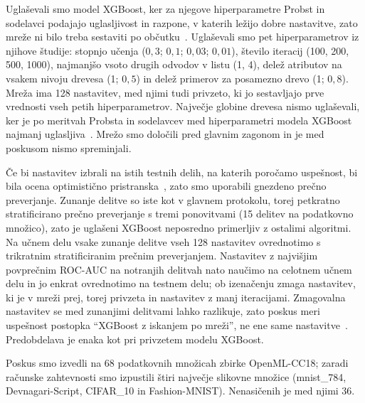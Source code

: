 \documentclass[a4paper,12pt,openright]{book}
\begin{document}
Uglaševali smo model XGBoost, ker za njegove hiperparametre Probst in
sodelavci podajajo uglasljivost in razpone, v katerih ležijo dobre nastavitve,
zato mreže ni bilo treba sestaviti po občutku~\cite{probst2019tunability}.
Uglaševali smo pet hiperparametrov iz njihove študije: stopnjo učenja
($0{,}3$; $0{,}1$; $0{,}03$; $0{,}01$), število iteracij (100, 200, 500, 1000),
najmanjšo vsoto drugih odvodov v listu (1, 4), delež atributov na vsakem nivoju
drevesa (1; $0{,}5$) in delež primerov za posamezno drevo (1; $0{,}8$). Mreža
ima 128 nastavitev, med njimi tudi privzeto, ki jo sestavljajo prve vrednosti
vseh petih hiperparametrov. Največje globine drevesa nismo uglaševali, ker je
po meritvah Probsta in sodelavcev med hiperparametri modela XGBoost najmanj
uglasljiva~\cite{probst2019tunability}. Mrežo smo določili pred glavnim
zagonom in je med poskusom nismo spreminjali.

Če bi nastavitev izbrali na istih testnih delih, na katerih poročamo
uspešnost, bi bila ocena optimistično pristranska~\cite{cawley2010over,varma2006bias},
zato smo uporabili gnezdeno prečno preverjanje. Zunanje delitve so iste kot v glavnem protokolu,
torej petkratno stratificirano prečno preverjanje s tremi ponovitvami (15
delitev na podatkovno množico), zato je uglašeni XGBoost neposredno primerljiv
z ostalimi algoritmi. Na učnem delu
vsake zunanje delitve vseh 128 nastavitev ovrednotimo s trikratnim
stratificiranim prečnim preverjanjem. Nastavitev z najvišjim povprečnim
ROC-AUC na notranjih delitvah nato naučimo na celotnem učnem delu in jo enkrat
ovrednotimo na testnem delu; ob izenačenju zmaga nastavitev, ki je v mreži
prej, torej privzeta in nastavitev z manj iteracijami. Zmagovalna nastavitev se med
zunanjimi delitvami lahko razlikuje, zato poskus meri uspešnost postopka
\enquote{XGBoost z iskanjem po mreži}, ne ene same
nastavitve~\cite{bischl2023hyperparameter}. Predobdelava je enaka kot pri
privzetem modelu XGBoost.

Poskus smo izvedli na 68 podatkovnih množicah zbirke OpenML-CC18; zaradi
računske zahtevnosti smo izpustili štiri največje slikovne množice
(mnist\_784, Devnagari-Script, CIFAR\_10 in Fashion-MNIST). Nenasičenih je
med njimi 36.
\end{document}
